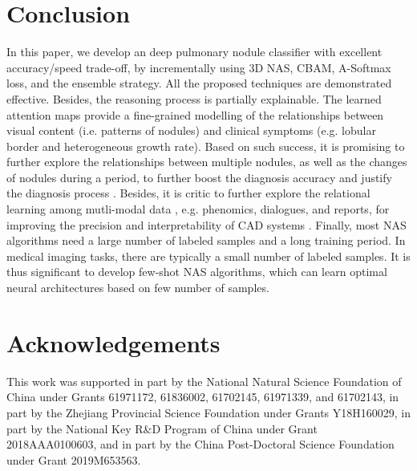 \documentclass[final,5p,times,twocolumn]{elsarticle}
\begin{document}
\section{Conclusion}
\label{sec:conclusion}

In this paper, we develop an deep pulmonary nodule classifier with excellent accuracy/speed trade-off, by incrementally using 3D NAS, CBAM, A-Softmax loss, and the ensemble strategy. All the proposed techniques are demonstrated effective. Besides, the reasoning process is partially explainable. 
The learned attention maps provide a fine-grained modelling of the relationships between visual content (i.e. patterns of nodules) and clinical symptoms (e.g. lobular border and heterogeneous growth rate). 
Based on such success, it is promising to further explore the relationships between multiple nodules, as well as the changes of nodules during a period, to further boost the diagnosis accuracy and justify the diagnosis process \cite{yang2020relational}. 
Besides, it is critic to further explore the relational learning among mutli-modal data \cite{zhan2019exploring}, e.g. phenomics, dialogues, and reports, for improving the precision and interpretability of CAD systems \cite{xu2019end}. 
Finally, most NAS algorithms need a large number of labeled samples and a long training period. In medical imaging tasks, there are typically a small number of labeled samples. It is thus significant to develop few-shot NAS algorithms, which can learn optimal neural architectures based on few number of samples.  

\section*{Acknowledgements}
This work was supported in part by the National Natural Science Foundation of China under Grants 61971172, 61836002, 61702145, 61971339, and 61702143, in part by the Zhejiang Provincial Science Foundation under Grants Y18H160029, in part by the National Key R\&D Program of China under Grant 2018AAA0100603, and in part by the China Post-Doctoral Science Foundation under Grant 2019M653563.




\end{document}
